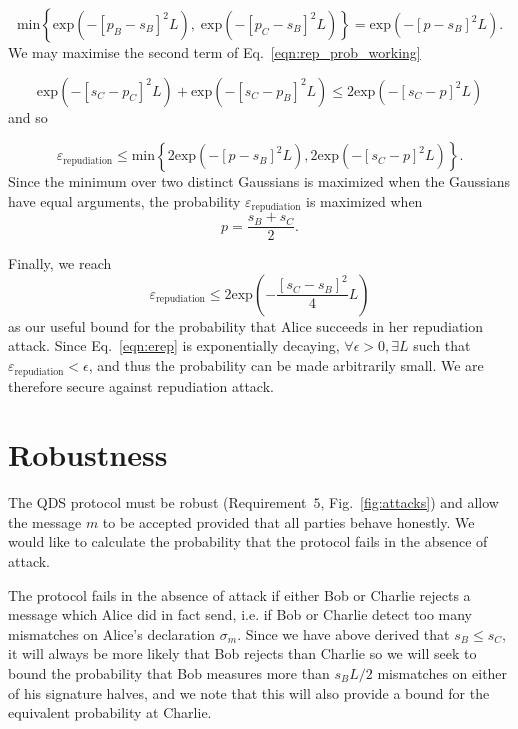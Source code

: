 \begin{equation}
\text{min}\left\{\text{exp}\left(- \left[p_B - s_B\right]^2L\right), \; \text{exp}\left(- \left[p_C - s_B\right]^2L\right)\right\} = \text{exp}\left(-\left[p - s_B\right]^2L\right).
\end{equation}
We may maximise the second term of Eq.~\ref{eqn:rep_prob_working} 

\begin{equation}
\text{exp}\left(- \left[s_C - p_C\right]^2 L \right) + \text{exp}\left(- \left[s_C - p_B\right]^2 L \right) \le 2 \text{exp}\left( - \left[s_C - p\right]^2 L\right)
\end{equation}
and so

\begin{equation}
\varepsilon_{\text{repudiation}} \le \text{min}\left\{ 2 \text{exp}\left( - \left[p - s_B\right]^2 L \right), 2 \text{exp}\left( - \left[s_C - p\right]^2 L \right) \right\}.
\end{equation}
Since the minimum over two distinct Gaussians is maximized when the Gaussians have equal arguments, the probability $\varepsilon_{\text{repudiation}}$ is maximized when 
\begin{equation}
p = \frac{s_B + s_C}{2}.
\end{equation}

Finally, we reach
\begin{equation}\label{eqn:erep}
\varepsilon_{\text{repudiation}} \le 2 \text{exp}\left( - \frac{\left[s_C - s_B\right]^2}{4} L\right)
\end{equation}
as our useful bound for the probability that Alice succeeds in her repudiation attack. Since Eq.~\ref{eqn:erep} is exponentially decaying, $\forall \epsilon > 0,  \exists L$ such that $\varepsilon_{\text{repudiation}} < \epsilon$, and thus the probability can be made arbitrarily small. We are therefore secure against repudiation attack.


\section{Robustness}
The QDS protocol must be robust (Requirement~$5$, Fig.~\ref{fig:attacks}) and allow the message $m$ to be accepted provided that all parties behave honestly. We would like to calculate the probability that the protocol fails in the absence of attack.

The protocol fails in the absence of attack if either Bob or Charlie rejects a message which Alice did in fact send, i.e. if Bob or Charlie detect too many mismatches on Alice's declaration $\sigma_m$. Since we have above derived that $s_B \le s_C$, it will always be more likely that Bob rejects than Charlie so we will seek to bound the probability that Bob measures more than $s_B L/2$ mismatches on either of his signature halves, and we note that this will also provide a bound for the equivalent probability at Charlie.

